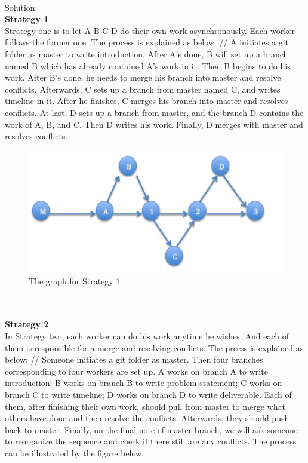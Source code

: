 \documentclass[12pt]{article}
\begin{document}
\noindent\ \\Solution:\\
\textbf{Strategy 1}\\
Strategy one is to let A B C D do their own work asynchronously. Each worker follows the former one. The process is explained as below: //
 A initiates a git folder as master to write introduction. After A\textquoteright s done, B will set up a branch named B which has already contained A\textquoteright s work in it. Then B begins to do his work. After B\textquoteright s done, he needs to merge his branch into master and resolve conflicts. Afterwards, C sets up a branch from master named C, and writes timeline in it. After he finishes, C merges his branch into master and resolves conflicts. At last, D sets up a branch from master, and the branch D contains the work of A, B, and C. Then D writes his work. Finally, D merges with master and resolves conflicts. 
\begin{figure}[h]
    \begin{center}
        \includegraphics[scale=0.6]{s1.png}
    \end{center}
    \caption{The graph for Strategy 1}
    \label{fig:branch}
\end{figure}
\\
\\
\textbf{Strategy 2}\\
In Strategy two, each worker can do his work anytime he wishes. And each of them is responsible for a merge and resolving conflicts. The prcess is explained as below: //
Someone initiates a git folder as master. Then four branches corresponding to four workers are set up. A works on branch A to write introduction; B works on branch B to write problem statement; C works on branch C to write timeline; D works on branch D to write deliverable. Each of them, after finishing their own work, should pull from master to merge what others have done and then resolve the conflicts. Afterwards, they should push back to master. Finally, on the final note of master branch, we will ask someone to reorganize the sequence and check if there still are any conflicts. The process can be illustrated by the figure below.
\end{document}
